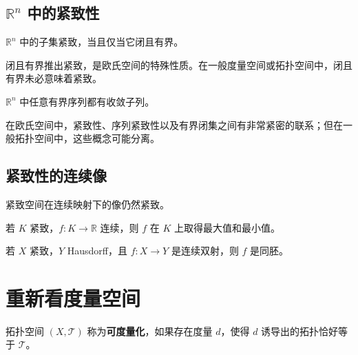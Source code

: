 \subsection{\texorpdfstring{$\mathbb{R}^n$}{Rn} 中的紧致性}

\begin{theorem}
$\mathbb{R}^n$ 中的子集紧致，当且仅当它闭且有界。
\end{theorem}

\begin{remark}
闭且有界推出紧致，是欧氏空间的特殊性质。在一般度量空间或拓扑空间中，闭且有界未必意味着紧致。
\end{remark}

\begin{theorem}
$\mathbb{R}^n$ 中任意有界序列都有收敛子列。
\end{theorem}

\begin{remark}
在欧氏空间中，紧致性、序列紧致性以及有界闭集之间有非常紧密的联系；但在一般拓扑空间中，这些概念可能分离。
\end{remark}

\subsection{紧致性的连续像}

\begin{theorem}
紧致空间在连续映射下的像仍然紧致。
\end{theorem}

\begin{theorem}[极值定理]
若 $K$ 紧致，$f:K\to\mathbb{R}$ 连续，则 $f$ 在 $K$ 上取得最大值和最小值。
\end{theorem}

\begin{theorem}
若 $X$ 紧致，$Y$ Hausdorff，且 $f:X\to Y$ 是连续双射，则 $f$ 是同胚。
\end{theorem}

\section{重新看度量空间}

\begin{definition}[可度量化空间]
拓扑空间 $(X,\mathcal{T})$ 称为\textbf{可度量化}，如果存在度量 $d$，使得 $d$ 诱导出的拓扑恰好等于 $\mathcal{T}$。
\end{definition}

